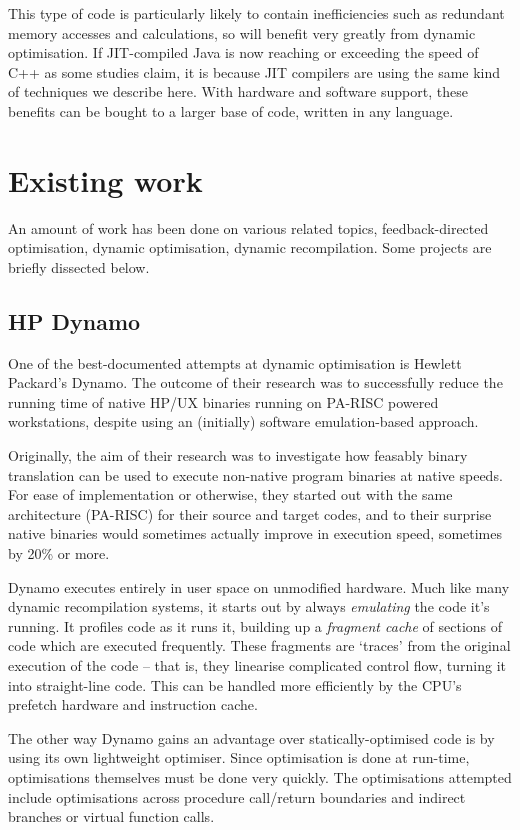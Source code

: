 This type of code is particularly likely to contain inefficiencies such as redundant memory accesses and calculations, so will benefit very greatly from dynamic optimisation. If JIT-compiled Java is now reaching or exceeding the speed of C++ as some studies claim, it is because JIT compilers are using the same kind of techniques we describe here. With hardware and software support, these benefits can be bought to a larger base of code, written in any language.


\section{Existing work}

An amount of work has been done on various related topics, feedback-directed
optimisation, dynamic optimisation, dynamic recompilation. Some projects
are briefly dissected below.


\subsection{HP Dynamo}

One of the best-documented attempts at dynamic optimisation is Hewlett
Packard's Dynamo. The outcome of their research was to successfully
reduce the running time of native HP/UX binaries running on PA-RISC
powered workstations, despite using an (initially) software emulation-based
approach.

Originally, the aim of their research was to investigate how feasably
binary translation can be used to execute non-native program binaries
at native speeds. For ease of implementation or otherwise, they started
out with the same architecture (PA-RISC) for their source and target
codes, and to their surprise native binaries would sometimes actually
improve in execution speed, sometimes by 20\% or more.

Dynamo executes entirely in user space on unmodified hardware. Much
like many dynamic recompilation systems, it starts out by always \emph{emulating}
the code it's running. It profiles code as it runs it, building up
a \emph{fragment cache} of sections of code which are executed frequently.
These fragments are `traces' from the original execution of the code
-- that is, they linearise complicated control flow, turning it into
straight-line code. This can be handled more efficiently by the CPU's
prefetch hardware and instruction cache.

The other way Dynamo gains an advantage over statically-optimised
code is by using its own lightweight optimiser. Since optimisation
is done at run-time, optimisations themselves must be done very quickly.
The optimisations attempted include optimisations across procedure
call/return boundaries and indirect branches or virtual function calls.

